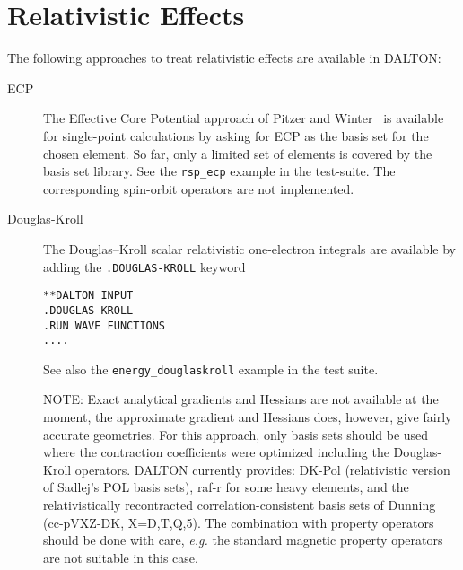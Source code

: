\chapter{\label{chap:Relativity}Relativistic Effects}

The following approaches to treat relativistic effects are available in DALTON:

\begin{description}

\item[ECP]
The Effective Core Potential approach of Pitzer and
Winter~\cite{rmpnmwijqc40} is available for single-point calculations
by asking for ECP as the basis set for the chosen element. So far,
only a limited set of elements is covered by the basis set library. See
the \verb|rsp_ecp| example in the test-suite. The corresponding spin-orbit
operators are not implemented.

\begin{center}
\end{center}


\item[Douglas-Kroll] The Douglas--Kroll scalar relativistic one-electron integrals  
are available by adding the \verb|.DOUGLAS-KROLL|   keyword
\begin{verbatim}
**DALTON INPUT
.DOUGLAS-KROLL
.RUN WAVE FUNCTIONS
....
\end{verbatim}

See also the \verb|energy_douglaskroll| example in the test suite.

  NOTE: Exact analytical gradients and Hessians are not available 
at the moment, the approximate gradient and Hessians does, however, give fairly accurate geometries.  For this approach, only basis sets should be used 
where the contraction coefficients were optimized including the Douglas-Kroll 
operators. DALTON currently provides:  DK-Pol (relativistic version of Sadlej's POL basis sets), raf-r for some heavy elements, and the relativistically recontracted correlation-consistent basis sets of Dunning (cc-pVXZ-DK, X=D,T,Q,5). The combination with 
property operators should be done with care, {\it e.g.\/} the standard
magnetic property operators are not suitable in this case.


\end{description}
